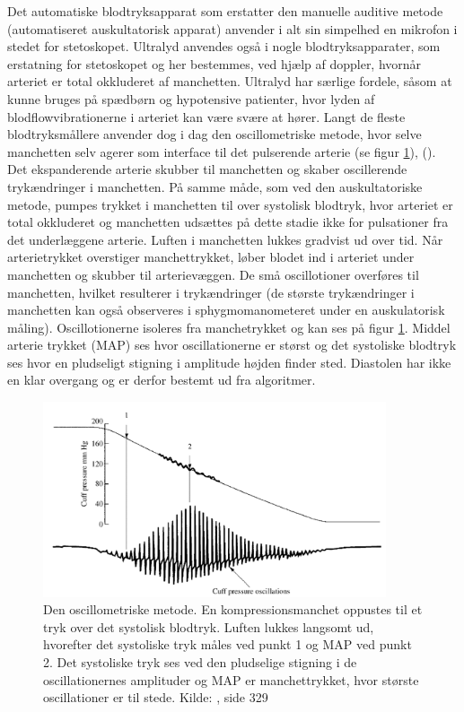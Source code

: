 Det automatiske blodtryksapparat som erstatter den manuelle auditive metode (automatiseret auskultatorisk apparat) anvender i alt sin simpelhed en mikrofon i stedet for stetoskopet. Ultralyd anvendes også i nogle blodtryksapparater, som erstatning for stetoskopet og her bestemmes, ved hjælp af doppler, hvornår arteriet er total okkluderet af manchetten. Ultralyd har særlige fordele, såsom at kunne bruges på spædbørn og hypotensive patienter, hvor lyden af blodflowvibrationerne i arteriet kan være svære at hører. Langt de fleste blodtryksmållere anvender dog i dag den oscillometriske metode, hvor selve manchetten selv agerer som interface til det pulserende arterie (se figur \ref{fig:OscillometriskMetode}), (\cite{RefWorks:24}). Det ekspanderende arterie skubber til manchetten og skaber oscillerende trykændringer i manchetten. På samme måde, som ved den auskultatoriske metode, pumpes trykket i manchetten til over systolisk blodtryk, hvor arteriet er total okkluderet og manchetten udsættes på dette stadie ikke for pulsationer fra det underlæggene arterie. Luften i manchetten lukkes gradvist ud over tid. Når arterietrykket overstiger manchettrykket, løber blodet ind i arteriet under manchetten og skubber til arterievæggen. De små oscillotioner overføres til manchetten, hvilket resulterer i trykændringer (de største trykændringer i manchetten kan også observeres i sphygmomanometeret under en auskulatorisk måling). Oscillotionerne isoleres fra manchetrykket og kan ses på figur \ref{fig:OscillometriskMetode}. Middel arterie trykket (MAP) ses hvor oscillationerne er størst og det systoliske blodtryk ses hvor en pludseligt stigning i amplitude højden finder sted. Diastolen har ikke en klar overgang og er derfor bestemt ud fra algoritmer.

\begin{figure}[H]
	\centering
	\includegraphics[width=0.9\textwidth]{billeder/OscillometriskMetode.png}
	\caption{Den oscillometriske metode. En kompressionsmanchet oppustes til et tryk over det systolisk blodtryk. Luften lukkes langsomt ud, hvorefter det systoliske tryk måles ved punkt 1 og MAP ved punkt 2. Det systoliske tryk ses ved den pludselige stigning i de oscillationernes amplituder og MAP er manchettrykket, hvor største oscillationer er til stede. Kilde: \cite{RefWorks:27}, side 329} \label{fig:OscillometriskMetode}
\end{figure}

